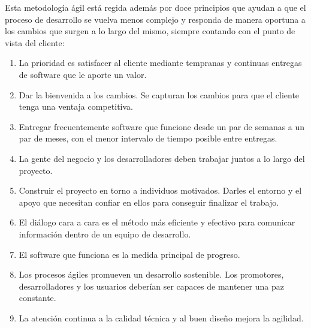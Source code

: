 \documentclass[../Main.tex]{subfiles}
\begin{document}
\begin{justify}
Esta metodología ágil está regida además por doce principios \cite{27} que ayudan a que el proceso de desarrollo se vuelva menos complejo y responda de manera oportuna a los cambios que surgen a lo largo del mismo, siempre contando con el punto de vista del cliente:
\end{justify}\par
\begin{enumerate}
	\item La prioridad es satisfacer al cliente mediante tempranas y continuas entregas de software que le aporte un valor. \par

	\item Dar la bienvenida a los cambios. Se capturan los cambios para que el cliente tenga una ventaja competitiva.  \par

	\item Entregar frecuentemente software que funcione desde un par de semanas a un par de meses, con el menor intervalo de tiempo posible entre entregas.  \par

    \item La gente del negocio y los desarrolladores deben trabajar juntos a lo largo del proyecto. \par
    
    \item Construir el proyecto en torno a individuos motivados. Darles el entorno y el apoyo que necesitan confiar en ellos para conseguir finalizar el trabajo. \par
    
    \item El diálogo cara a cara es el método más eficiente y efectivo para comunicar información dentro de un equipo de desarrollo. \par
    
    \item El software que funciona es la medida principal de progreso. \par
    
    \item Los procesos ágiles promueven un desarrollo sostenible. Los promotores, desarrolladores y los usuarios deberían ser capaces de mantener una paz constante. \par
    
    \item La atención continua a la calidad técnica y al buen diseño mejora la agilidad. \par
    

\end{enumerate}
\end{document}
